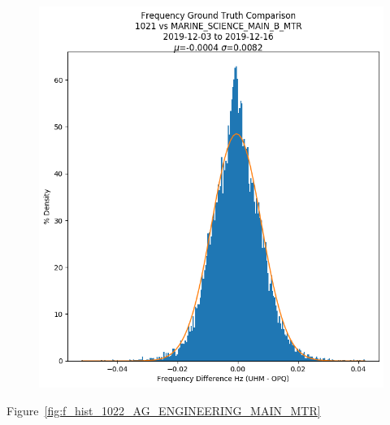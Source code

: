 \begin{figure}[H]
    \centering
    \includegraphics[width=\linewidth]{figures/f_hist_1021_MARINE_SCIENCE_MAIN_B_MTR.png}
    \caption{}
    \label{fig:f_hist_1021_MARINE_SCIENCE_MAIN_B_MTR}
\end{figure}

Figure~\ref{fig:f_hist_1022_AG_ENGINEERING_MAIN_MTR}

